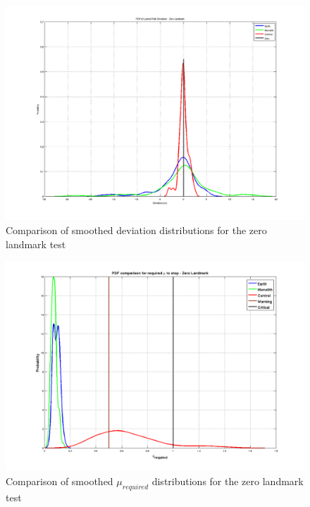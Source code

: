 \begin{figure}[ht] \centering %
    \includegraphics[width=6in]{./figs/zero_landmark_dev_pdf.png}
    \caption{Comparison of smoothed deviation distributions for the zero landmark test} \label{fig:zero_dev_dist}
\end{figure}
\begin{figure}[ht] \centering %
    \includegraphics[width=6in]{./figs/zero_landmark_mu_distribution.png}
    \caption{Comparison of smoothed $\mu_{required}$ distributions for the zero landmark test} \label{fig:zero_mu_dist}
\end{figure}
